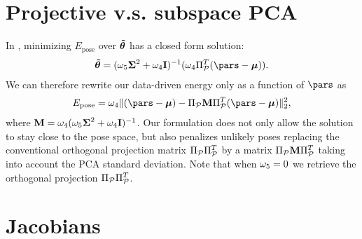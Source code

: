 \appendix

\vspace{-.15in}
\section{Projective v.s. subspace PCA}
\label{app:pca}
In , minimizing $E_{\text{pose}}$ over $\boldsymbol{\tilde\theta}$ has a closed form solution:
%
\begin{eqnarray*}
\parssub = (\omegapcareg\boldsymbol{\Sigma}^2 + \omegapcaproj\mathbf{I})^{-1}(\omegapcaproj\proj_\posespace^T (\pars - \boldsymbol{\mu})).  
\label{eq:pcaproj2}
\end{eqnarray*}
%
We can therefore rewrite our data-driven energy only as a function of $\pars$ as 
% 
\begin{eqnarray*}
E_{\text{pose}}  = \omegapcaproj \|(\pars - \boldsymbol{\mu}) - \proj_\posespace\mathbf{M}\proj_\posespace^T (\pars - \boldsymbol{\mu})\|_2^2,   
\label{eq:pcaproj3}
\end{eqnarray*}
% 
where $\mathbf{M} = \omega_4(\omega_5\boldsymbol{\Sigma}^2 + \omega_4\mathbf{I})^{-1}$.
Our formulation does not only allow the solution to stay close to the pose space, but also penalizes unlikely poses replacing the conventional orthogonal projection matrix $\Pi_{\mathcal{P}}\Pi_{\mathcal{P}}^T$ by a matrix $\Pi_{\mathcal{P}}\mathbf{M}\Pi_{\mathcal{P}}^T$ taking into account the PCA standard deviation. Note that when $\omega_5=0$ we retrieve the orthogonal projection  $\Pi_{\mathcal{P}}\Pi_{\mathcal{P}}^T$.

\vspace{-.15in}
\section{Jacobians}
\label{app:jacobians}

